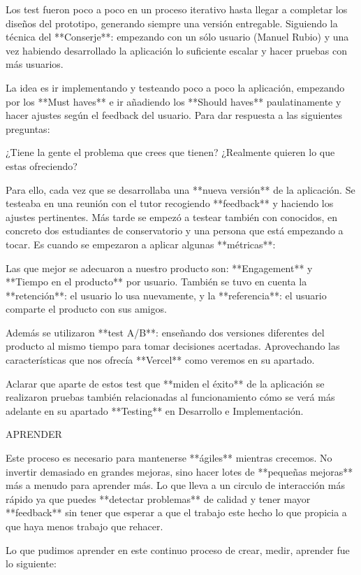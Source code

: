 \documentclass[12pt,twoside,titlepage]{report}
\begin{document}
Los test fueron poco a poco en un proceso iterativo hasta llegar a completar los diseños del prototipo, generando siempre una versión entregable. Siguiendo la técnica del **Conserje**: empezando con un sólo usuario (Manuel Rubio) y una vez habiendo desarrollado la aplicación lo suficiente escalar y hacer pruebas con más usuarios.

La idea es ir implementando y testeando poco a poco la aplicación, empezando por los **Must haves** e ir añadiendo los **Should haves** paulatinamente y hacer ajustes según el feedback del usuario. Para dar respuesta a las siguientes preguntas:

¿Tiene la gente el problema que crees que tienen? ¿Realmente quieren lo que estas ofreciendo?

Para ello, cada vez que se desarrollaba una **nueva versión** de la aplicación. Se testeaba en una reunión con el tutor recogiendo **feedback** y haciendo los ajustes pertinentes. Más tarde se empezó a testear también con conocidos, en concreto dos estudiantes de conservatorio y una persona que está empezando a tocar. Es cuando se empezaron a aplicar algunas **métricas**:

Las que mejor se adecuaron a nuestro producto son: **Engagement** y **Tiempo en el producto** por usuario. También se tuvo en cuenta la **retención**: el usuario lo usa nuevamente, y la **referencia**: el usuario comparte el producto con sus amigos.

Además se utilizaron **test A/B**: enseñando dos versiones diferentes del producto al mismo tiempo para tomar decisiones acertadas. Aprovechando las características que nos ofrecía **Vercel** como veremos en su apartado.

Aclarar que aparte de estos test que **miden el éxito** de la aplicación se realizaron pruebas también relacionadas al funcionamiento cómo se verá más adelante en su apartado **Testing** en Desarrollo e Implementación.

APRENDER

Este proceso es necesario para mantenerse **ágiles** mientras crecemos. No invertir demasiado en grandes mejoras, sino hacer lotes de **pequeñas mejoras** más a menudo para aprender más. Lo que lleva a un circulo de interacción más rápido ya que puedes **detectar problemas** de calidad y tener mayor **feedback** sin tener que esperar a que el trabajo este hecho lo que propicia a que haya menos trabajo que rehacer.

Lo que pudimos aprender en este continuo proceso de crear, medir, aprender fue lo siguiente:
\end{document}
